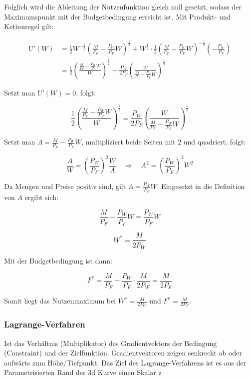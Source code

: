 Folglich wird die Ableitung der Nutzenfunktion gleich null gesetzt, sodass der Maximumspunkt mit der Budgetbedingung erreicht ist. Mit Produkt- und Kettenregel gilt:

\begin{align}
    U'(W) &= \frac{1}{2} W^{-\frac{1}{2}} \left( \frac{M}{P_F} - \frac{P_W}{P_F} W \right)^{\frac{1}{2}} 
    + W^{\frac{1}{2}} \cdot \frac{1}{2} \left( \frac{M}{P_F} - \frac{P_W}{P_F} W \right)^{-\frac{1}{2}} \left( -\frac{P_W}{P_F} \right) \\
    &= \frac{1}{2}\left(\frac{\frac{M}{P_F} - \frac{P_W}{P_F} W}{W}\right)^{\frac{1}{2}} - \frac{P_W}{2P_F}\left(\frac{W}{\frac{M}{P_F} - \frac{P_W}{P_F} W}\right)^{\frac{1}{2}}
\end{align}

Setzt man $U'(W)=0$, folgt:

\begin{equation}
    \frac{1}{2}\left(\frac{\frac{M}{P_F} - \frac{P_W}{P_F} W}{W}\right)^{\frac{1}{2}} = \frac{P_W}{2P_F}\left(\frac{W}{\frac{M}{P_F} - \frac{P_W}{P_F} W}\right)^{\frac{1}{2}}
\end{equation}

Setzt man $A = \frac{M}{P_F} - \frac{P_W}{P_F}W$, multipliziert beide Seiten mit $2$ und quadriert, folgt:

\begin{equation}
    \frac{A}{W} = \left(\frac{P_W}{P_F}\right)^2 \frac{W}{A}
    \quad\Longrightarrow\quad
    A^2 = \left(\frac{P_W}{P_F}\right)^2 W^2
\end{equation}

\pagebreak
Da Mengen und Preise positiv sind, gilt $A = \frac{P_W}{P_F}W$. Eingesetzt in die Definition von $A$ ergibt sich:

\begin{equation}
    \frac{M}{P_F} - \frac{P_W}{P_F}W = \frac{P_W}{P_F}W
\end{equation}

\begin{equation}
    W^* = \frac{M}{2P_W}
\end{equation}

Mit der Budgetbedingung ist dann:

\begin{equation}
    F^* = \frac{M}{P_F} - \frac{P_W}{P_F}\cdot \frac{M}{2P_W} = \frac{M}{2P_F}
\end{equation}

Somit liegt das Nutzenmaximum bei $W^* = \frac{M}{2P_W}$ und $F^* = \frac{M}{2P_F}$.


\subsubsection{Lagrange-Verfahren}
Ist das Verhältnis  (Multiplikator) des Gradientvektors der Bedingung (Constraint) und der Zielfunktion. Gradientvektoren zeigen senkrecht ab oder aufwärts zum Höhe/Tiefpunkt. Das Ziel des Lagrange-Verfahrens ist es aus der Parametrisierten Rand der 3d Kurve einen Skalar z
